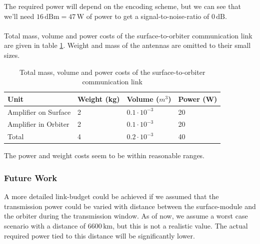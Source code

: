 The required power will depend on the encoding scheme, but we can see that we'll need $16\,\mathrm{dBm}=47\,\mathrm{W}$ of power to get a signal-to-noise-ratio of $0\,\mathrm{dB}$.\\
\\
Total mass, volume and power costs of the surface-to-orbiter communication link are given in table \ref{tab:commsurf}. Weight and mass of the antennas are omitted to their small sizes.
\begin{table}[htb]
\centering

\label{my-label}
\begin{tabular}{|l|l|l|l|}
\hline
\textbf{Unit}        & \textbf{Weight (kg)} & \textbf{Volume ($m^{3}$)} & \textbf{Power (W)} \\ \hline
Amplifier on Surface & 2                    & $0.1\cdot 10^{-3}$        & 20                 \\ \hline
Amplifier in Orbiter & 2                    & $0.1\cdot 10^{-3}$        & 20                 \\ \hline
\hline
Total                & 4                    & $0.2\cdot 10^{-3}$        & 40                 \\ \hline
\end{tabular}
\caption{Total mass, volume and power costs of the surface-to-orbiter communication link}
\label{tab:commsurf}
\end{table}
The power and weight costs seem to be within reasonable ranges. 
\subsubsection{Future Work}

A more detailed link-budget could be achieved if we assumed that the transmission power could be varied with distance between the surface-module and the orbiter during the transmission window. As of now, we assume a worst case scenario with a distance of $6600\,\mathrm{km}$, but this is not a realistic value. The actual required power tied to this distance will be significantly lower.\\

